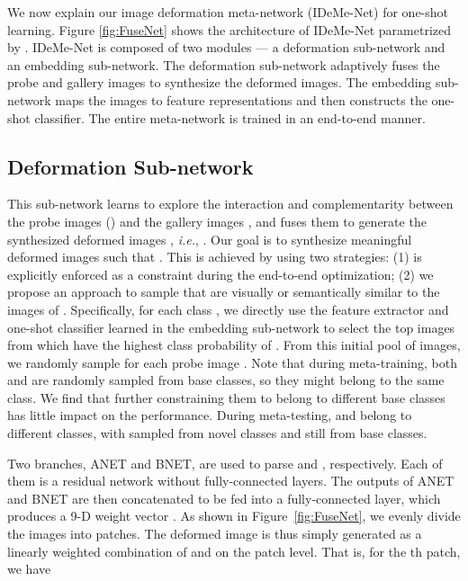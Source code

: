 \documentclass[10pt,letterpaper,twocolumn]{article}
\begin{document}
We now explain our image deformation meta-network (IDeMe-Net) for
one-shot learning. Figure \ref{fig:FuseNet} shows the architecture
of IDeMe-Net  parametrized by . IDeMe-Net
is composed of two modules --- a deformation sub-network and an embedding
sub-network. The deformation sub-network adaptively fuses the probe
and gallery images to synthesize the deformed images. The embedding
sub-network maps the images to feature representations and then constructs
the one-shot classifier. The entire meta-network is trained in an
end-to-end manner.

\subsection{Deformation Sub-network}

This sub-network  learns to explore
the interaction and complementarity between the probe images 
() and the gallery
images , and fuses them to generate the
synthesized deformed images , \emph{i.e.}, .
Our goal is to synthesize meaningful deformed images such that
. This is achieved by using two strategies: (1)
 is explicitly enforced as a constraint during
the end-to-end optimization; (2) we propose an approach
to sample  that are visually or semantically
similar to the images of . Specifically, for each class , we directly use
the feature extractor and one-shot classifier learned in the embedding
sub-network to select the top  images from  which
have the highest class probability of . From this initial pool of images, we randomly sample  for each probe image . Note that during meta-training, both  and  are randomly sampled from base classes, so they might belong to the same class. We find that further constraining them to belong to different base classes has little impact on the performance. During meta-testing,  and  belong to different classes, with  sampled from novel classes and  still from base classes.





Two branches, ANET and BNET, are used to parse 
and , respectively. Each of them is a residual
network \cite{he2015deep} without fully-connected layers. The outputs
of ANET and BNET are then concatenated to be fed into a fully-connected
layer, which produces a 9-D weight vector . As shown in Figure~\ref{fig:FuseNet}, we evenly divide the images into  patches. The deformed
image is thus simply generated as a linearly weighted combination of  and  on the patch level. That is, for the th patch, we have
\end{document}
